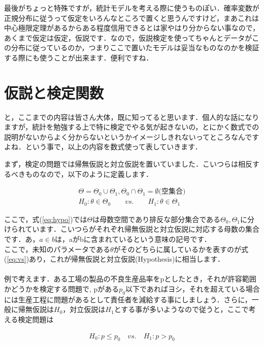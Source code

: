 \documentclass[11pt,a4paper,uplatex]{ujreport} 	%
\begin{document}
最後がちょっと特殊ですが，統計モデルを考える際に使うものぽい．確率変数が正規分布に従うって仮定をいろんなところで置くと思うんですけど，まあこれは中心極限定理があるからある程度信用できるとは家やはり分からない事なので，あくまで仮定は仮定，仮説です．なので，仮説検定を使ってちゃんとデータがこの分布に従っているのか，つまりここで置いたモデルは妥当なものなのかを検証する際にも使うことが出来ます．便利ですね．

\section{仮説と検定関数}
と，ここまでの内容は皆さん大体，既に知ってると思います．個人的な話になりますが，統計を勉強する上で特に検定でやる気が起きないの，とにかく数式での説明がないからよく分からないというかイメージしきれないってところなんですよね．という事で，以上の内容を数式使って表していきます．

まず，検定の問題では帰無仮説と対立仮説を置いていました．こいつらは相反するべきものなので，以下のように定義します．

\begin{align}
  \Theta = \Theta_0 \cup \Theta_1, \Theta_0 \cap \Theta_1 = \emptyset \text{(空集合)}
  \label{eq:hypo}\\
  H_0: \theta \in \Theta_0 \qquad vs. \qquad H_1:\theta \in \Theta_1
  \label{eq:vs}
\end{align}

ここで，式(\ref{eq:hypo})では$\Theta$は母数空間であり排反な部分集合である$\Theta_0, \Theta_1$に分けられています．こいつらがそれぞれ帰無仮説と対立仮説に対応する母数の集合です．あ，$a \in b$は，aがbに含まれているという意味の記号です．\\

ここで，未知のパラメータである$\theta$がそのどちらに属しているかを表すのが式(\ref{eq:vs})あり，これが帰無仮説と対立仮説(Hypothesis)に相当します．\\\\

例で考えます．ある工場の製品の不良生産品率をpとしたとき，それが許容範囲かどうかを検定する問題で, pがある$p_0$以下であればヨシ，それを超えている場合には生産工程に問題があるとして責任者を減給する事にしましょう．さらに，一般に帰無仮説は$H_0$，対立仮説は$H_1$とする事が多いようなので従うと，ここで考える検定問題は

\begin{align}
 H_0 :p\leq p_0 \quad vs. \quad H_1 :p> p_0 
\end{align}
\end{document}
